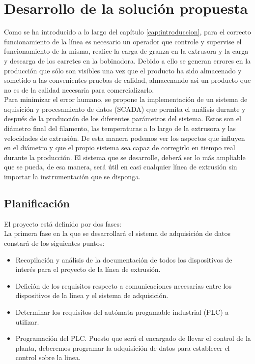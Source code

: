 \chapter{Desarrollo de la solución propuesta}
\label{cap:descrip}

Como se ha introducido a lo largo del capítulo \ref{cap:introduccion}, para el correcto funcionamiento de la línea es necesario un operador que controle y supervise el funcionamiento de la misma, realice la carga de granza en la extrusora y la carga y descarga de los carretes en la bobinadora. Debido a ello se generan errores en la producción que sólo son visibles una vez que el producto ha sido almacenado y sometido a las convenientes pruebas de calidad, almacenando asi un producto que no es de la calidad necesaria para comercializarlo.\\

Para minimizar el error humano, se propone la implementación de un sistema de aquisición y procesamiento de datos (SCADA) que permita el análisis durante y después de la producción de los diferentes parámetros del sistema. Estos son el diámetro final del filamento, las temperaturas a lo largo de la extrusora y las velocidades de extrusión. De esta manera podemos ver los aspectos que influyen en el diámetro y que el propio sistema sea capaz de corregirlo en tiempo real durante la producción. El sistema que se desarrolle, deberá ser lo más ampliable que se pueda, de esa manera, será útil en casi cualquier línea de extrusión sin importar la instrumentación que se disponga.

\section{Planificación}
\label{sec:planificacion}

El proyecto está definido por dos fases:\\

La primera fase en la que se desarrollará el sistema de adquisición de datos constará de los siguientes puntos:

\begin{itemize}
    \item Recopilación y análisis de la documentación de todos los dispositivos de interés para el proyecto de la línea de extrusión.
    \item Defición de los requisitos respecto a comunicaciones necesarias entre los dispositivos de la línea y el sistema de adquisición.
    \item Determinar los requisitos del autómata progamable industrial (PLC) a utilizar.
    \item Programación del PLC. Puesto que será el encargado de llevar el control de la planta, deberemos programar la adquisición de datos para establecer el control sobre la linea.
\end{itemize}

